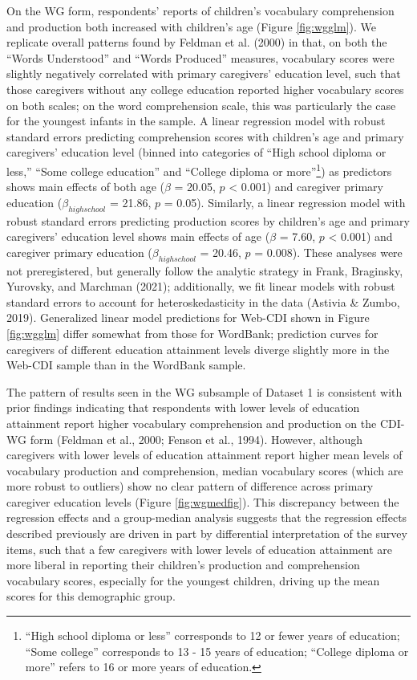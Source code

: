 \documentclass[
  english,
  ,man,floatsintext]{apa6}
\begin{document}
On the WG form, respondents' reports of children's vocabulary comprehension and production both increased with children's age (Figure \ref{fig:wgglm}). We replicate overall patterns found by Feldman et al. (2000) in that, on both the ``Words Understood'' and ``Words Produced'' measures, vocabulary scores were slightly negatively correlated with primary caregivers' education level, such that those caregivers without any college education reported higher vocabulary scores on both scales; on the word comprehension scale, this was particularly the case for the youngest infants in the sample. A linear regression model with robust standard errors predicting comprehension scores with children's age and primary caregivers' education level (binned into categories of ``High school diploma or less,'' ``Some college education'' and ``College diploma or more''\footnote{``High school diploma or less'' corresponds to 12 or fewer years of education; ``Some college'' corresponds to 13 - 15 years of education; ``College diploma or more'' refers to 16 or more years of education.}) as predictors shows main effects of both age (\(\beta\) = 20.05, \(p\) \textless{} 0.001) and caregiver primary education (\(\beta_{high school}\) = 21.86, \(p\) = 0.05). Similarly, a linear regression model with robust standard errors predicting production scores by children's age and primary caregivers' education level shows main effects of age (\(\beta\) = 7.60, \(p\) \textless{} 0.001) and caregiver primary education (\(\beta_{high school}\) = 20.46, \(p\) = 0.008). These analyses were not preregistered, but generally follow the analytic strategy in Frank, Braginsky, Yurovsky, and Marchman (2021); additionally, we fit linear models with robust standard errors to account for heteroskedasticity in the data (Astivia \& Zumbo, 2019). Generalized linear model predictions for Web-CDI shown in Figure \ref{fig:wgglm} differ somewhat from those for WordBank; prediction curves for caregivers of different education attainment levels diverge slightly more in the Web-CDI sample than in the WordBank sample.

The pattern of results seen in the WG subsample of Dataset 1 is consistent with prior findings indicating that respondents with lower levels of education attainment report higher vocabulary comprehension and production on the CDI-WG form (Feldman et al., 2000; Fenson et al., 1994). However, although caregivers with lower levels of education attainment report higher mean levels of vocabulary production and comprehension, median vocabulary scores (which are more robust to outliers) show no clear pattern of difference across primary caregiver education levels (Figure \ref{fig:wgmedfig}). This discrepancy between the regression effects and a group-median analysis suggests that the regression effects described previously are driven in part by differential interpretation of the survey items, such that a few caregivers with lower levels of education attainment are more liberal in reporting their children's production and comprehension vocabulary scores, especially for the youngest children, driving up the mean scores for this demographic group.
\end{document}
